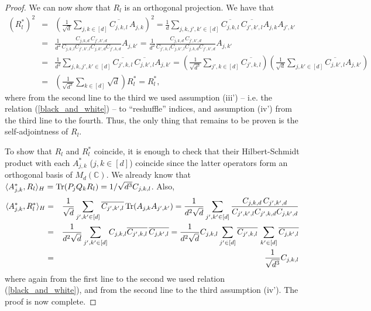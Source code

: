 \documentclass[12pt]{amsart}
\numberwithin{equation}{section}
\theoremstyle{definition}
\theoremstyle{remark}
\theoremstyle{remark}
\newcommand{\CC}{\ensuremath{\mathbb{C}}}
\begin{document}
\begin{proof}
We can now show that $R_l$ is an orthogonal projection. We have that
\begin{eqnarray}
\nonumber
(R_l^*)^2 &=& \left(\frac{1}{\sqrt{d}}\sum_{j,k \in [d]}\overline{C_{j,k,l}}\, A_{j,k}\right)^2 = 
\frac{1}{d}
\sum_{j,k,j',k'\in [d]}
\overline{C_{j,k,l}}\,
\overline{C_{j',k',l}}
A_{j,k}A_{j',k'}
\\
\nonumber
&=&
\frac{1}{d^2}
\frac{C_{j,k,d} \, C_{j',k',d}}{ 
C_{j,k,l}
C_{j',k',l} C_{j,k',d} C_{j',k,d}}
A_{j,k'} = 
\frac{1}{d^2}
\frac{C_{j,k,d} \, C_{j',k',d}}{ 
C_{j',k,l}
C_{j,k',l} C_{j,k,d} C_{j',k',d}}
A_{j,k'}
\\
\nonumber
&=&
\frac{1}{d^2}
\sum_{j,k,j',k'\in [d]}
\overline{C_{j',k,l}}\,
\overline{C_{j,k',l}}
A_{j,k'} = 
\left(\frac{1}{\sqrt{d^3}}
\sum_{j',k\in [d]}
\overline{C_{j',k,l}} \right)
\left(\frac{1}{\sqrt{d}}
\sum_{j,k'\in [d]}
\overline{C_{j,k',l}}
A_{j,k'} \right)
\\
\nonumber
&=&
\left(\frac{1}{\sqrt{d^3}}
\sum_{k\in [d]}
\sqrt{d}
\right) R_l^*
=R_l^*,
\end{eqnarray}
where from the second line to the third we used assumption (iii') -- i.e. the relation (\ref{black_and_white}) -- to ``reshuffle'' indices, and assumption (iv') from the third line to the fourth. Thus, the only thing that remains to be proven is the self-adjointness
of $R_l$.

To show that $R_l$ and $R_l^*$
coincide, it is enough to check that their Hilbert-Schmidt product with each $A_{j,k}^*$ ($j,k\in [d]$) coincide since the latter operators form an orthogonal basis of $M_d(\CC)$. 
We already know that
$\langle A_{j,k}^*,R_l\rangle_{H} = {\rm Tr}(P_j Q_k R_l)=1/\sqrt{d^3} C_{j,k,l}$. Also,
\begin{eqnarray}
\nonumber
\langle A_{j,k}^*,R_l^*\rangle_{H} &=& \frac{1}{\sqrt{d}}
\sum_{j',k'\in [d]} \overline{C_{j',k',l}}\,
{\rm Tr}(A_{j,k} A_{j',k'})=
\frac{1}{d^2\sqrt{d}}
\sum_{j',k'\in [d]} 
\frac{C_{j,k,d}\, C_{j',k',d}}{ 
C_{j',k',l} C_{j',k,d} C_{j,k',d}}
\\
\nonumber
&=&
\frac{1}{d^2\sqrt{d}}
\sum_{j',k'\in [d]} 
C_{j,k,l}
\overline{C_{j',k,l}}\, \overline{C_{j,k',l}}
=\frac{1}{d^2\sqrt{d}}
C_{j,k,l}
\sum_{j'\in [d]} 
\overline{C_{j',k,l}}\, 
\sum_{k'\in [d]} 
\overline{C_{j,k',l}}
\\
\nonumber
&=&
\frac{1}{\sqrt{d^3}}
C_{j,k,l}
\end{eqnarray}
where again from the first line to the second we used relation
(\ref{black_and_white}), and from 
the second line to the third assumption (iv'). The proof is now complete. 
\end{proof}
\end{document}

